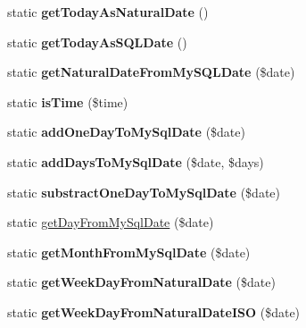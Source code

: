 \begin{DoxyCompactItemize}
\mbox{\label{class_date_functions_a6074f853a3ae060af67592313a0b207d}} 
static {\bfseries get\+Today\+As\+Natural\+Date} ()
\item 
\mbox{\label{class_date_functions_af30b962085dbe7788a0301c212197939}} 
static {\bfseries get\+Today\+As\+S\+Q\+L\+Date} ()
\item 
\mbox{\label{class_date_functions_a4c9f8d1d6a1ad952d405e8537036e380}} 
static {\bfseries get\+Natural\+Date\+From\+My\+S\+Q\+L\+Date} (\$date)
\item 
\mbox{\label{class_date_functions_a2ac587dc798385988d09c5fefa5502e9}} 
static {\bfseries is\+Time} (\$time)
\item 
\mbox{\label{class_date_functions_a3eac993abbae946c13c1fb76ffc54e4c}} 
static {\bfseries add\+One\+Day\+To\+My\+Sql\+Date} (\$date)
\item 
\mbox{\label{class_date_functions_a25c9dd17dbdd53b29578a4cd60c8f015}} 
static {\bfseries add\+Days\+To\+My\+Sql\+Date} (\$date, \$days)
\item 
\mbox{\label{class_date_functions_a8ed7b0d8dbb2f5a4701f7e2b1efe3146}} 
static {\bfseries substract\+One\+Day\+To\+My\+Sql\+Date} (\$date)
\item 
static \mbox{\hyperlink{class_date_functions_aa75a36f4316f24e28b67087faade8bbc}{get\+Day\+From\+My\+Sql\+Date}} (\$date)
\item 
\mbox{\label{class_date_functions_a4523a454a3819b50196cdf341b31cd0f}} 
static {\bfseries get\+Month\+From\+My\+Sql\+Date} (\$date)
\item 
\mbox{\label{class_date_functions_a9f7869ed3627eed62eb5592559f56568}} 
static {\bfseries get\+Week\+Day\+From\+Natural\+Date} (\$date)
\item 
\mbox{\label{class_date_functions_a7fc3046f382e098f6c65bc60ed5f28f8}} 
static {\bfseries get\+Week\+Day\+From\+Natural\+Date\+I\+SO} (\$date)
\item 

\end{DoxyCompactItemize}
